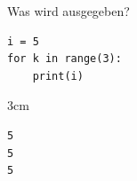 \question[2]
Was wird ausgegeben?  
\begin{lstlisting}
i = 5
for k in range(3):
    print(i)
\end{lstlisting}
\begin{solutionbox}{3cm}
\begin{lstlisting}
5
5
5 
\end{lstlisting}
\end{solutionbox}